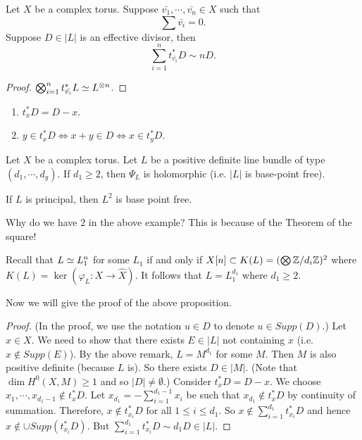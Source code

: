 \begin{lemma}
Let $X$ be a complex torus.
Suppose $\bar{v_1},\cdots,\bar{v_n}\in X$ such that $$\sum \bar{v_i}=0.$$ Suppose $D\in |L|$ is an effective divisor, then 
$$\sum_{i=1}^n t_{\bar{v_i}}^* D\sim nD.$$
\end{lemma}

\begin{proof}
$\bigotimes_{i=1}^n t_{\bar{v_i}}^* L \simeq L^{\otimes n}$.
\end{proof}

\begin{remark}
\noindent
\begin{enumerate}
\item $t_x^* D = D-x$.
\item $y\in t_x^*D \Leftrightarrow x+y\in D\Leftrightarrow x\in t_y^*D$.  
\end{enumerate}
\end{remark}

\begin{proposition}
Let $X$ be a complex torus. Let $L$ be a positive definite line bundle of type $(d_1,\cdots, d_g)$. If $d_1\geq 2$, then $\Psi_L$ is holomorphic (i.e. $|L|$ is base-point free). 
\end{proposition}

\begin{example}
If $L$ is principal, then $L^2$ is base point free.
\end{example}

\begin{remark}
Why do we have $2$ in the above example? This is because of the Theorem of the square!
\end{remark}

\begin{remark}
Recall that $L\simeq L_1^n$ for some $L_1$ if and only if $X[n]\subset K(L)=(\bigotimes {\mathbb Z}/d_i{\mathbb Z})^2$ where $K(L)=\ker(\varphi_L:X\to \hat{X})$. It follows that $L=L_1^{d_1}$ where $d_1\geq 2$. 
\end{remark}

Now we will give the proof of the above proposition.
\begin{proof}
(In the proof, we use the notation $u\in D$ to denote $u\in Supp(D)$.)
Let $x\in X$. We need to show that there exists $E\in |L|$ not containing $x$ (i.e. $x\not\in Supp(E)$).  
By the above remark, $L=M^{d_1}$ for some $M$. Then $M$ is also positive definite (because $L$ is). So there exists $D\in |M|$. (Note that $\dim H^0(X,M)\geq 1$ and so $|D|\not=\emptyset$.) Consider $t_x^* D=D-x$. We choose $x_1,\cdots, x_{d_1-1}\not\in t_x^* D$. Let $x_{d_1}=-\sum_{i=1}^{d_1-1} x_i$ be such that $x_{d_1}\not\in t_x^*D$ by continuity of summation. 
Therefore, $x\not\in t_{x_i}^* D$ for all $1\leq i \leq d_1$. So $x\not\in \sum_{i=1}^{d_1} t_{x_i}^* D$ and hence $x\not\in \cup Supp(t_{x_i}^* D)$. But $\sum_{i=1}^{d_1} t_{x_i}^* D \sim d_1D\in |L|$. 

\end{proof}

